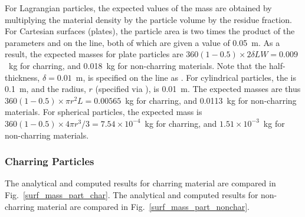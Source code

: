 \documentclass[11pt]{book}
\begin{document}
For Lagrangian particles, the expected values of the mass are obtained by multiplying the material density by the particle volume by the residue fraction. For Cartesian surfaces (plates), the particle area is two times the product of the parameters  and  on the  line, both of which are given a value of 0.05~m. As a result, the expected masses for plate particles are $360 (1-0.5) \times 2\delta L W=0.009$~kg for charring, and 0.018~kg for non-charring materials. Note that the half-thickness, $\delta=0.01$~m, is specified on the  line as . For cylindrical particles, the  is 0.1~m, and the radius, $r$ (specified via ), is 0.01~m. The expected masses are thus $360(1-0.5) \times \pi r^2 L=0.00565$~kg for charring, and 0.0113~kg for non-charring materials. For spherical particles, the expected mass is $360(1-0.5) \times 4\pi r^3/3=7.54\times 10^{-4}$~kg for charring, and $1.51\times 10^{-3}$~kg for non-charring materials.

\subsubsection{Charring Particles}

The analytical and computed results for charring material are compared in Fig.~\ref{surf_mass_part_char}. The analytical and computed results for non-charring material are compared in Fig.~\ref{surf_mass_part_nonchar}.
\end{document}
